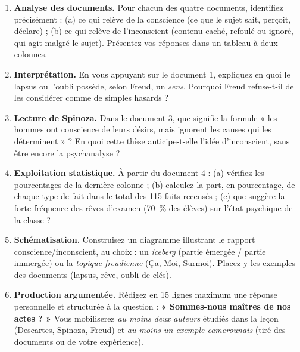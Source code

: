 \documentclass[11pt]{article}
\newcommand{\cle}[1]{{\popxbold\color{popdark}#1}}
\newcounter{popsec}
\newcounter{popsub}
\newcommand{\courssub}[1]{%
  \stepcounter{popsub}%
  \par\vspace{9pt}\noindent{\popxbold\fontsize{11.5}{13}\selectfont\color{popink}{\color{poporange}\thepopsec.\thepopsub}\hspace{6pt}#1}\par\nopagebreak\vspace{4pt}
}
\begin{document}
\begin{enumerate}
\item \textbf{Analyse des documents.} Pour chacun des quatre documents, identifiez précisément : (a) ce qui relève de la \cle{conscience} (ce que le sujet sait, perçoit, déclare) ; (b) ce qui relève de l'\cle{inconscient} (contenu caché, refoulé ou ignoré, qui agit malgré le sujet). Présentez vos réponses dans un tableau à deux colonnes.
\item \textbf{Interprétation.} En vous appuyant sur le document 1, expliquez en quoi le lapsus ou l'oubli possède, selon Freud, un \emph{sens}. Pourquoi Freud refuse-t-il de les considérer comme de simples hasards ?
\item \textbf{Lecture de Spinoza.} Dans le document 3, que signifie la formule « les hommes ont conscience de leurs désirs, mais ignorent les causes qui les déterminent » ? En quoi cette thèse anticipe-t-elle l'idée d'inconscient, sans être encore la psychanalyse ?
\item \textbf{Exploitation statistique.} À partir du document 4 : (a) vérifiez les pourcentages de la dernière colonne ; (b) calculez la part, en pourcentage, de chaque type de fait dans le total des 115 faits recensés ; (c) que suggère la forte fréquence des rêves d'examen (70~\% des élèves) sur l'état psychique de la classe ?
\item \textbf{Schématisation.} Construisez un diagramme illustrant le rapport conscience/inconscient, au choix : un \emph{iceberg} (partie émergée / partie immergée) ou la \emph{topique freudienne} (Ça, Moi, Surmoi). Placez-y les exemples des documents (lapsus, rêve, oubli de clés).
\item \textbf{Production argumentée.} Rédigez en 15 lignes maximum une réponse personnelle et structurée à la question : \textbf{« Sommes-nous maîtres de nos actes ? »} Vous mobiliserez \emph{au moins deux auteurs} étudiés dans la leçon (Descartes, Spinoza, Freud) et \emph{au moins un exemple camerounais} (tiré des documents ou de votre expérience).
\end{enumerate}

\courssub{Ressources à mobiliser}
\end{document}
